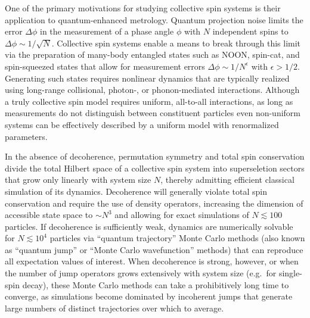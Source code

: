 \documentclass[pra,reprint,longbibliography]{revtex4-1}
\newcommand{\1}{\mathds{1}}
\begin{document}
One of the primary motivations for studying collective spin systems is
their application to quantum-enhanced metrology.  Quantum projection
noise limits the error $\Delta\phi$ in the measurement of a phase
angle $\phi$ with $N$ independent spins to
$\Delta\phi\sim1/\sqrt{N}$\cite{wineland1992spin, itano1993quantum,
  ma2011quantum}.  Collective spin systems enable a means to break
through this limit via the preparation of many-body entangled states
such as NOON\cite{jones2009magnetic, chen2010heralded,
  zhong2010simplified}, spin-cat\cite{huang2015quantum,
  agarwal1997atomic, lau2014proposal}, and spin-squeezed
states\cite{takano2009spin, riedel2010atomchipbased,
  gross2010nonlinear, hosten2016quantum, norcia2018cavitymediated,
  wineland1992spin, kitagawa1993squeezed, ma2011quantum} that allow
for measurement errors $\Delta\phi\sim1/N^\epsilon$ with
$\epsilon>1/2$.  Generating such states requires nonlinear dynamics
that are typically realized using long-range collisional, photon-, or
phonon-mediated interactions.  Although a truly collective spin model
requires uniform, all-to-all interactions, as long as measurements do
not distinguish between constituent particles even non-uniform systems
can be effectively described by a uniform model with renormalized
parameters\cite{hu2015entangled}.

In the absence of decoherence, permutation symmetry and total spin
conservation divide the total Hilbert space of a collective spin
system into superseletion sectors that grow only linearly with system
size $N$, thereby admitting efficient classical simulation of its
dynamics.  Decoherence will generally violate total spin conservation
and require the use of density operators, increasing the dimension of
accessible state space to $\sim N^3$\cite{hartmann2016generalized,
  xu2013simulating} and allowing for exact simulations of
$N\lesssim100$ particles.  If decoherence is sufficiently weak,
dynamics are numerically solvable for $N\lesssim10^4$ particles via
``quantum trajectory'' Monte Carlo methods\cite{plenio1998quantumjump,
  zhang2018montecarlo} (also known as ``quantum jump'' or ``Monte
Carlo wavefunction'' methods) that can reproduce all expectation
values of interest.  When decoherence is strong, however, or when the
number of jump operators grows extensively with system size (e.g.~for
single-spin decay), these Monte Carlo methods can take a prohibitively
long time to converge, as simulations become dominated by incoherent
jumps that generate large numbers of distinct trajectories over which
to average.
\end{document}
